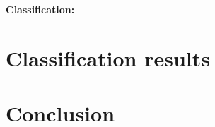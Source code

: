 \documentclass[runningheads]{llncs}
\begin{document}
\textbf{Classification:} 


\section{Classification results}




\section{Conclusion} \label{sec:conclusion}



\end{document}
